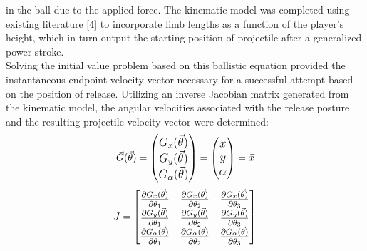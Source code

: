\documentclass[12pt]{article}
\begin{document}
\begin{multicols}{2}
\noindent in the ball due to the applied force. The kinematic model was completed using existing literature [4] to incorporate limb lengths as a function of the player’s height, which in turn output the starting position of projectile after a generalized power stroke.\\
Solving the initial value problem based on this ballistic equation provided the instantaneous endpoint velocity vector necessary for a successful attempt based on the position of release. Utilizing an inverse Jacobian matrix generated from the kinematic model, the angular velocities associated with the release posture and the resulting projectile velocity vector were determined: \\
\begin{equation}
\centering \large
\vec{G}( \vec{\theta} )
=
\begin{pmatrix}
G_{x}(\vec{\theta}) \\
G_{y}(\vec{\theta}) \\
G_{\alpha}(\vec{\theta}) \\
\end{pmatrix}
=
\begin{pmatrix}
x \\
y \\
\alpha \\
\end{pmatrix} 
= 
\vec{x}
\end{equation}
\begin{equation}
\centering \large
J = 
\begin{bmatrix}
\frac{\partial G_{x}(\vec{\theta})}{\partial\theta_{1}} & \frac{\partial G_{x}(\vec{\theta})}{\partial\theta_{2}}  & \frac{\partial G_{x}(\vec{\theta})}{\partial\theta_{3}}  \\
\frac{\partial G_{y}(\vec{\theta})}{\partial\theta_{1}} & \frac{\partial G_{y}(\vec{\theta})}{\partial\theta_{2}}  & \frac{\partial G_{y}(\vec{\theta})}{\partial\theta_{3}}  \\
\frac{\partial G_{\alpha}(\vec{\theta})}{\partial\theta_{1}} & \frac{\partial G_{\alpha}(\vec{\theta})}{\partial\theta_{2}}  & \frac{\partial G_{\alpha}(\vec{\theta})}{\partial\theta_{3}}  \\
\end{bmatrix} 
\end{equation}


\end{multicols}
\end{document}

